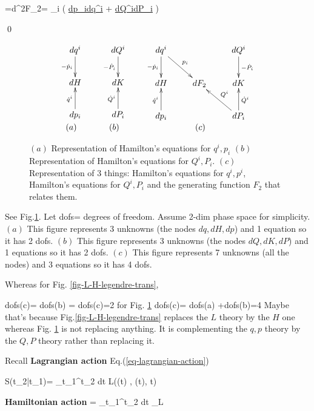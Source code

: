 =d^2F_2=
\sum_i
\left(
\ul{dp_i}\wedge \ul{dq^i}
+
\ul{dQ^i}\wedge \ul{dP_i}
\right)
\eeq

\qed


\begin{figure}[h!]
$$
\begin{array}{ccc}
\xymatrix{
dq^i
\ar[d]_{-\dot{p}_i}
\\
dH
\\
dp_i
\ar[u]^{\dot{q}^i}
}
&\quad
\xymatrix{
dQ^i
\ar[d]_{-\dot{P}_i}
\\
dK
\\
dP_i
\ar[u]^{\dot{Q}^i}
}
\quad
&
\xymatrix{
dq^i\ar[dr]^{p_i}
\ar[d]_{-\dot{p}_i}
 &&dQ^i\ar[d]^{-\dot{P}_i}
\\
dH
& dF_2 
&   dK
\\
dp_i\ar[u]^{\dot{q}^i}
&& dP_i\ar[ul]_{Q^i}
\ar[u]_{\dot{Q}^i}
}
\\
(a) & (b) & (c)
\end{array}
$$
\caption{$(a)$ Representation of
Hamilton's equations for $q^i, p_i$
$(b)$ Representation of Hamilton's equations
for $Q^i, P_i$.
$(c)$ Representation of 3 things: Hamilton's equations
for $q^i, p^i$, Hamilton's equations for $Q^i, P_i$
and the generating function $F_2$ 
that relates them.
}
\label{fig-canonical-trans}
\end{figure}

See Fig.\ref{fig-canonical-trans}.
Let dofs=  degrees of freedom.
Assume 2-dim phase space for simplicity.
$(a)$ This figure represents 3 unknowns (the nodes $dq, dH, dp$) and 1 equation so it has 2 dofs.
$(b)$  This figure represents 3 unknowns (the nodes $dQ, dK, dP$) and 1 equations so it has 2 dofs. $(c)$ 
This figure represents 7 unknowns (all the nodes) and 3 equations so it has 4 dofs.


Whereas for Fig. \ref{fig-L-H-legendre-trans},

\beq
dofs(c)= dofs(b)
= dofs(c)=2
\eeq
for Fig. \ref{fig-canonical-trans}
\beq 
dofs(c)= dofs(a) +dofs(b)=4
\eeq
Maybe that's because 
Fig.\ref{fig-L-H-legendre-trans}
replaces the $L$ theory by the $H$ one whereas 
Fig. \ref{fig-canonical-trans}
is not replacing anything. It
is complementing the $q,p$ theory by the $Q, P$ theory rather than 
replacing it.


Recall
{\bf Lagrangian action}
Eq.(\ref{eq-lagrangian-action})

\beq
S(t_2|t_1)=
\int_{t_1}^{t_2}
dt\;
L(\vecq(t)
, \dot{\vecq}(t), t)
\eeq


{\bf Hamiltonian action}
\beq
\cala = 
\int_{t_1}^{t_2}
dt
_{L}
\eeq

